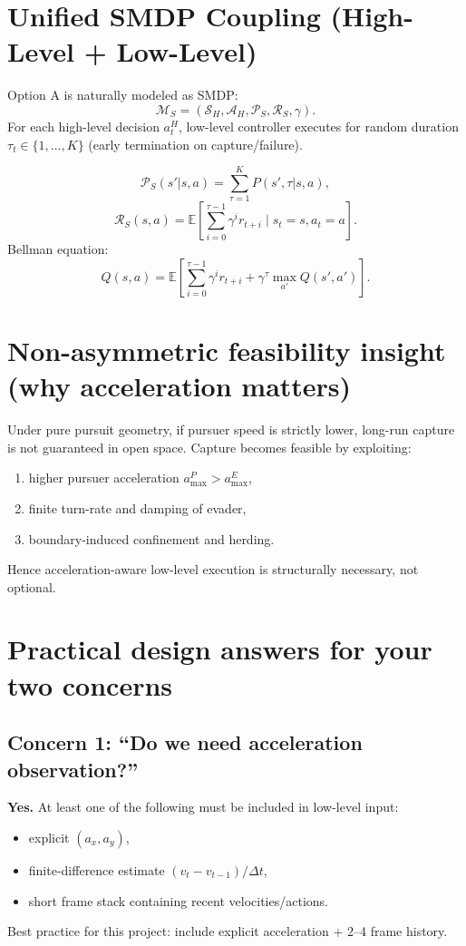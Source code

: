 \documentclass[11pt]{article}
\begin{document}
\section{Unified SMDP Coupling (High-Level + Low-Level)}

Option A is naturally modeled as SMDP:
\[
\mathcal{M}_{S}=(\mathcal{S}_H,\mathcal{A}_H,\mathcal{P}_S,\mathcal{R}_S,\gamma).
\]
For each high-level decision \(a_t^H\), low-level controller executes for random duration \(\tau_t\in\{1,\dots,K\}\) (early termination on capture/failure).

\begin{equation}
\mathcal{P}_S(s'|s,a)=\sum_{\tau=1}^{K}P(s',\tau|s,a),
\end{equation}
\begin{equation}
\mathcal{R}_S(s,a)=\mathbb{E}\left[\sum_{i=0}^{\tau-1}\gamma^i r_{t+i}\mid s_t=s,a_t=a\right].
\end{equation}
Bellman equation:
\begin{equation}
Q(s,a)=\mathbb{E}\left[\sum_{i=0}^{\tau-1}\gamma^i r_{t+i}+\gamma^{\tau}\max_{a'}Q(s',a')\right].
\end{equation}

\section{Non-asymmetric feasibility insight (why acceleration matters)}

Under pure pursuit geometry, if pursuer speed is strictly lower, long-run capture is not guaranteed in open space. Capture becomes feasible by exploiting:
\begin{enumerate}
  \item higher pursuer acceleration \(a^P_{\max}>a^E_{\max}\),
  \item finite turn-rate and damping of evader,
  \item boundary-induced confinement and herding.
\end{enumerate}
Hence acceleration-aware low-level execution is structurally necessary, not optional.

\section{Practical design answers for your two concerns}

\subsection{Concern 1: ``Do we need acceleration observation?''}
\textbf{Yes.} At least one of the following must be included in low-level input:
\begin{itemize}
  \item explicit \((a_x,a_y)\),
  \item finite-difference estimate \((v_t-v_{t-1})/\Delta t\),
  \item short frame stack containing recent velocities/actions.
\end{itemize}
Best practice for this project: include explicit acceleration + 2--4 frame history.
\end{document}
